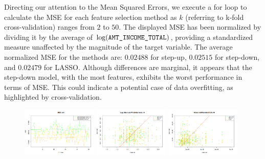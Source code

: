 \documentclass[hidelinks,12pt]{article}
\begin{document}
Directing our attention to the Mean Squared Errors, we execute a for loop to calculate the MSE for each feature selection method as $k$ (referring to k-fold cross-validation) ranges from $2$ to $50$. The displayed MSE has been normalized by dividing it by the average of $\log(\verb|AMT_INCOME_TOTAL|)$, providing a standardized measure unaffected by the magnitude of the target variable. The average normalized MSE for the methods are: $0.02488$ for step-up, $0.02515$ for step-down, and $0.02479$ for LASSO. Although differences are marginal, it appears that the step-down model, with the most features, exhibits the worst performance in terms of MSE. This could indicate a potential case of data overfitting, as highlighted by cross-validation.
\begin{figure}[h]
  \begin{center}
  \includegraphics[width=0.32\textwidth]{img/4ce6b823-353d-4cd1-8960-77f9e7637f0c.png}
  \includegraphics[width=0.32\textwidth]{img/5fbbbd32-5e14-434b-877f-548ddcf238b8.png}
  \includegraphics[width=0.32\textwidth]{img/d109caa8-4a84-490b-8da2-5df6a73cf0d6.png}
\end{center}
\end{figure}
\end{document}
